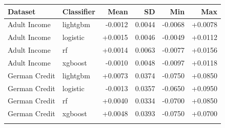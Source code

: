 \begin{tabular}{@{}llrrrr@{}}
\toprule
Dataset & Classifier & Mean & SD & Min & Max \\
\midrule
Adult Income & lightgbm & -0.0012 & 0.0044 & -0.0068 & +0.0078 \\
Adult Income & logistic & +0.0015 & 0.0046 & -0.0049 & +0.0112 \\
Adult Income & rf & +0.0014 & 0.0063 & -0.0077 & +0.0156 \\
Adult Income & xgboost & -0.0010 & 0.0048 & -0.0097 & +0.0118 \\
\addlinespace
German Credit & lightgbm & +0.0073 & 0.0374 & -0.0750 & +0.0850 \\
German Credit & logistic & -0.0013 & 0.0357 & -0.0650 & +0.0950 \\
German Credit & rf & +0.0040 & 0.0334 & -0.0700 & +0.0850 \\
German Credit & xgboost & +0.0048 & 0.0393 & -0.0750 & +0.0700 \\
\addlinespace
\bottomrule
\end{tabular}
